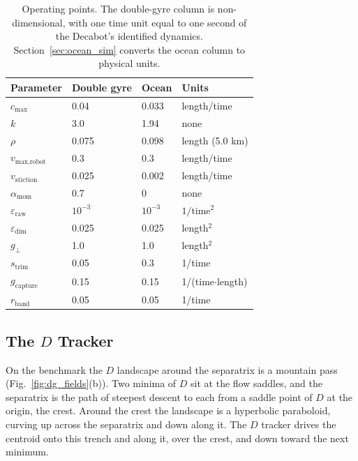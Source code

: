 \documentclass[lettersize,journal]{IEEEtran}
\begin{document}
\begin{table}[!t]
\caption{Operating points. The double-gyre column is non-dimensional,
with one time unit equal to one second of the Decabot's identified
dynamics. Section~\ref{sec:ocean_sim} converts the ocean column to
physical units.}
\label{tab:params}
\centering
\begin{tabular}{llll}
\hline
Parameter & Double gyre & Ocean & Units \\
\hline
$c_{\max}$              & 0.04  & 0.033  & length/time \\
$k$                     & 3.0   & 1.94   & none \\
$\rho$                  & 0.075 & 0.098  & length (5.0 km) \\
$v_{\text{max,robot}}$  & 0.3   & 0.3    & length/time \\
$v_{\text{stiction}}$   & 0.025 & 0.002  & length/time \\
$\alpha_{\text{mom}}$   & 0.7   & 0      & none \\
$\varepsilon_{\text{raw}}$ & $10^{-3}$ & $10^{-3}$ & $1/\text{time}^2$ \\
$\varepsilon_{\dim}$    & 0.025 & 0.025  & length$^2$ \\
$g_\perp$               & 1.0   & 1.0    & length$^2$ \\
$s_{\mathrm{trim}}$     & 0.05  & 0.3    & 1/time \\
$g_{\text{capture}}$    & 0.15  & 0.15   & 1/(time$\cdot$length) \\
$r_{\text{band}}$       & 0.05  & 0.05   & 1/time \\
\hline
\end{tabular}
\end{table}

\subsection{The $D$ Tracker}
\label{sec:sep_controller}

On the benchmark the $D$ landscape around the separatrix is a mountain
pass (Fig.~\ref{fig:dg_fields}(b)). Two minima of $D$ sit at the flow
saddles, and the separatrix is the path of steepest descent to each from
a saddle point of $D$ at the origin, the crest. Around the crest the
landscape is a hyperbolic paraboloid, curving up across the separatrix
and down along it. The $D$ tracker drives the centroid onto this trench
and along it, over the crest, and down toward the next minimum.
\end{document}

